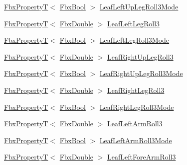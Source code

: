 \begin{DoxyCompactItemize}
\item 
\hyperlink{class_fbx_property_t}{Fbx\+PropertyT}$<$ \hyperlink{fbxtypes_8h_a92e0562b2fe33e76a242f498b362262e}{Fbx\+Bool} $>$ \hyperlink{class_fbx_character_a21b83a15b1e9251f7c0dd8cf7b05f10f}{Leaf\+Left\+Up\+Leg\+Roll3\+Mode}
\item 
\hyperlink{class_fbx_property_t}{Fbx\+PropertyT}$<$ \hyperlink{fbxtypes_8h_a171e72a1c46fc15c1a6c9c31948c1c5b}{Fbx\+Double} $>$ \hyperlink{class_fbx_character_ab83b35313550caf1d688b0cca866833d}{Leaf\+Left\+Leg\+Roll3}
\item 
\hyperlink{class_fbx_property_t}{Fbx\+PropertyT}$<$ \hyperlink{fbxtypes_8h_a92e0562b2fe33e76a242f498b362262e}{Fbx\+Bool} $>$ \hyperlink{class_fbx_character_a60007564e199c6446a6fccd3c96b3d27}{Leaf\+Left\+Leg\+Roll3\+Mode}
\item 
\hyperlink{class_fbx_property_t}{Fbx\+PropertyT}$<$ \hyperlink{fbxtypes_8h_a171e72a1c46fc15c1a6c9c31948c1c5b}{Fbx\+Double} $>$ \hyperlink{class_fbx_character_a894c18e97dd760fffdcbc0d794f49953}{Leaf\+Right\+Up\+Leg\+Roll3}
\item 
\hyperlink{class_fbx_property_t}{Fbx\+PropertyT}$<$ \hyperlink{fbxtypes_8h_a92e0562b2fe33e76a242f498b362262e}{Fbx\+Bool} $>$ \hyperlink{class_fbx_character_a39ec0921c6e8642645dc31a9262984a6}{Leaf\+Right\+Up\+Leg\+Roll3\+Mode}
\item 
\hyperlink{class_fbx_property_t}{Fbx\+PropertyT}$<$ \hyperlink{fbxtypes_8h_a171e72a1c46fc15c1a6c9c31948c1c5b}{Fbx\+Double} $>$ \hyperlink{class_fbx_character_ab61f326e59a7ac3e648896177b7396c3}{Leaf\+Right\+Leg\+Roll3}
\item 
\hyperlink{class_fbx_property_t}{Fbx\+PropertyT}$<$ \hyperlink{fbxtypes_8h_a92e0562b2fe33e76a242f498b362262e}{Fbx\+Bool} $>$ \hyperlink{class_fbx_character_a7d36ec898720956bfdae4945ebe08a34}{Leaf\+Right\+Leg\+Roll3\+Mode}
\item 
\hyperlink{class_fbx_property_t}{Fbx\+PropertyT}$<$ \hyperlink{fbxtypes_8h_a171e72a1c46fc15c1a6c9c31948c1c5b}{Fbx\+Double} $>$ \hyperlink{class_fbx_character_a22a6f5684392e9a2be33a58f8d1014a2}{Leaf\+Left\+Arm\+Roll3}
\item 
\hyperlink{class_fbx_property_t}{Fbx\+PropertyT}$<$ \hyperlink{fbxtypes_8h_a92e0562b2fe33e76a242f498b362262e}{Fbx\+Bool} $>$ \hyperlink{class_fbx_character_a43e2930b7cc27333684f4741f064471a}{Leaf\+Left\+Arm\+Roll3\+Mode}
\item 
\hyperlink{class_fbx_property_t}{Fbx\+PropertyT}$<$ \hyperlink{fbxtypes_8h_a171e72a1c46fc15c1a6c9c31948c1c5b}{Fbx\+Double} $>$ \hyperlink{class_fbx_character_a8e1ddd422cfd58cce77f5f165faf6471}{Leaf\+Left\+Fore\+Arm\+Roll3}

\end{DoxyCompactItemize}
